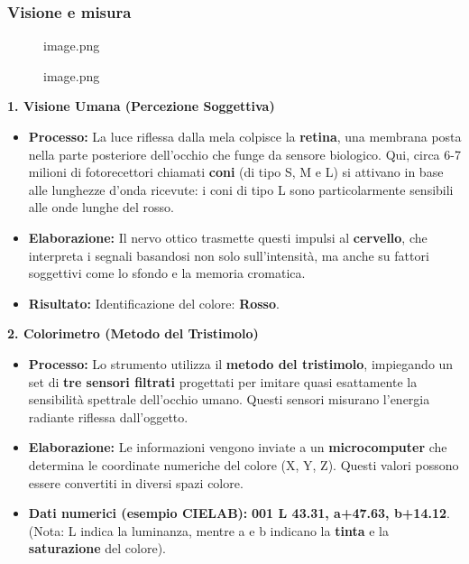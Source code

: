 \documentclass[
]{article}
\providecommand{\tightlist}{%
  \setlength{\itemsep}{0pt}\setlength{\parskip}{0pt}}
\begin{document}
\hypertarget{visione-e-misura}{%
\subsubsection{Visione e misura}\label{visione-e-misura}}

\begin{figure}
\centering
{image.png}
\caption{image.png}
\end{figure}

\textbf{1. Visione Umana (Percezione Soggettiva)}

\begin{itemize}
\tightlist
\item
  \textbf{Processo:} La luce riflessa dalla mela colpisce la \textbf{retina}, una membrana posta nella parte posteriore dell'occhio che funge da sensore biologico. Qui, circa 6-7 milioni di fotorecettori chiamati \textbf{coni} (di tipo S, M e L) si attivano in base alle lunghezze d'onda ricevute: i coni di tipo L sono particolarmente sensibili alle onde lunghe del rosso.
\item
  \textbf{Elaborazione:} Il nervo ottico trasmette questi impulsi al \textbf{cervello}, che interpreta i segnali basandosi non solo sull'intensità, ma anche su fattori soggettivi come lo sfondo e la memoria cromatica.
\item
  \textbf{Risultato:} Identificazione del colore: \textbf{Rosso}.
\end{itemize}

\textbf{2. Colorimetro (Metodo del Tristimolo)}

\begin{itemize}
\tightlist
\item
  \textbf{Processo:} Lo strumento utilizza il \textbf{metodo del tristimolo}, impiegando un set di \textbf{tre sensori filtrati} progettati per imitare quasi esattamente la sensibilità spettrale dell'occhio umano. Questi sensori misurano l'energia radiante riflessa dall'oggetto.
\item
  \textbf{Elaborazione:} Le informazioni vengono inviate a un \textbf{microcomputer} che determina le coordinate numeriche del colore (X, Y, Z). Questi valori possono essere convertiti in diversi spazi colore.
\item
  \textbf{Dati numerici (esempio CIELAB):} \textbf{001 L 43.31, a+47.63, b+14.12}. (Nota: L indica la luminanza, mentre a e b indicano la \textbf{tinta} e la \textbf{saturazione} del colore).
\end{itemize}
\end{document}
